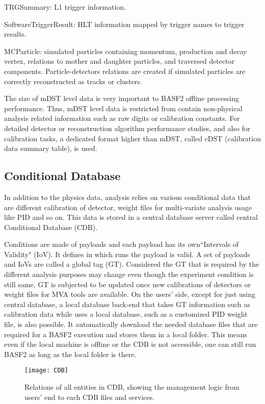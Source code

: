 \textbullet \space TRGSummary: L1 trigger information. 
 
\textbullet \space SoftwareTriggerResult: HLT information mapped by trigger names to trigger results. 

\textbullet \space  MCParticle: simulated particles containing 
momentum, production and decay vertex, relations
to mother and daughter particles, and traversed detector components. Particle-detectors relations are
created if simulated particles are correctly reconstructed as
tracks or clusters.

The size of mDST level data is very important to BASF2 offline processing performance. Thus, mDST level data is restricted from contain non-physical analysis related information such as raw digits or calibration constants. For detailed detector
or reconstruction algorithm performance studies, and also for calibration tasks, a dedicated format higher than mDST, called cDST 
(calibration data summary table), is used.
 

\subsection{Conditional Database}

In addition to the physics data, analysis relies on various conditional data that are different calibration of detector, weight files for multi-variate analysis usage like PID and so on. This data is stored in a central database server called central Conditional Database (CDB). 

Conditions are made of payloads and each payload has its own``Intervals of Validity" (IoV). It defines in which runs the payload is valid. A set of payloads and IoVs are called a global tag (GT). Considered the GT that is required by the different analysis purposes may change even though the experiment condition is still same, GT is subjected to be updated once new calibrations of detectors or weight files for MVA tools are available. On the users' side, except for just using central database, a local database back-end that takes GT information such as calibration data while uses a local database, such as a customized PID weight file,  is also possible.  It automatically download the needed database files that are required for a BASF2 execution and stores them in a local folder. This means even if the local machine is offline or the CDB is not accessible, one can still run BASF2 as long as the local folder is there. 

\begin{figure}[htbp]
	\centering
	\texttt{[image: CDB]}
	\caption{ Relations of all entities in CDB\cite{BASF2}, showing the management logic from users' end to each CDB files and services. }
	\label{fig:CDB}
\end{figure}

